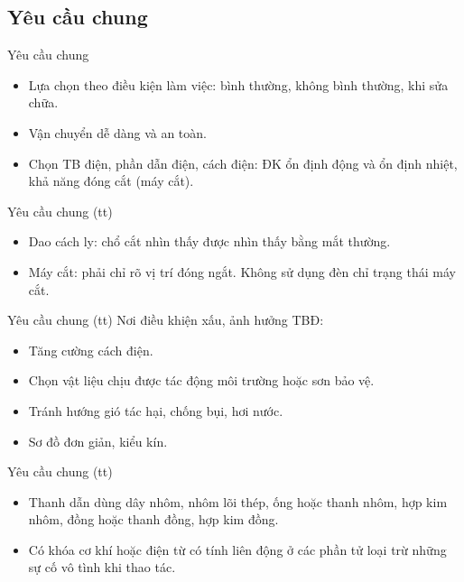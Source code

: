 \documentclass[20pt]{beamer}
\begin{document}
\subsection*{Yêu cầu chung}
\begin{frame}{Yêu cầu chung}	
	\begin{itemize}
	\justifying
		\item Lựa chọn theo điều kiện làm việc: \alert{bình thường}, \alert{không bình thường}, \alert{khi sửa chữa}.
		
		\item Vận chuyển dễ dàng và an toàn.
		
		\item Chọn TB điện, phần dẫn điện, cách điện: ĐK \alert{ổn định động} và \alert{ổn định nhiệt}, \alert{khả năng đóng cắt} (máy cắt).
	\end{itemize}
\end{frame}


\begin{frame}{Yêu cầu chung (tt)}	
	\begin{itemize}
	\justifying
		\item Dao cách ly: chổ cắt nhìn thấy được nhìn thấy bằng mắt thường.
		
		\item Máy cắt: phải chỉ rõ vị trí đóng ngắt. \alert{Không sử dụng đèn chỉ trạng thái máy cắt.}
	\end{itemize}
\end{frame}

\begin{frame}{Yêu cầu chung (tt)}
\justifying
	Nơi điều khiện xấu, ảnh hưởng TBĐ:
	\begin{itemize}
	\justifying
		\item Tăng cường cách điện.
			
		\item Chọn vật liệu chịu được tác động môi trường hoặc sơn bảo vệ.
			
		\item Tránh hướng gió tác hại, chống bụi, hơi nước.
			
		\item Sơ đồ đơn giản, kiểu kín.
	\end{itemize}
\end{frame}

\begin{frame}{Yêu cầu chung (tt)}
	\begin{itemize}
	\justifying
		\item 	\alert{Thanh dẫn} dùng dây nhôm, nhôm lõi thép, ống hoặc thanh nhôm, hợp kim nhôm, đồng hoặc thanh đồng, hợp kim đồng.
		
		\item Có \alert{khóa cơ khí hoặc điện từ có tính liên động} ở các phần tử loại trừ những sự cố vô tình khi thao tác.
	\end{itemize}
\end{frame}
\end{document}
